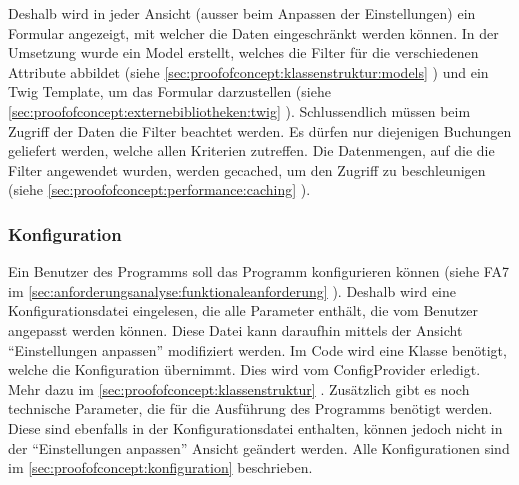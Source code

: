 Deshalb wird in jeder Ansicht (ausser beim Anpassen der Einstellungen) ein Formular angezeigt, mit welcher die Daten eingeschränkt werden können. In der Umsetzung wurde ein Model erstellt, welches die Filter für die verschiedenen Attribute abbildet (siehe \cref{sec:proofofconcept:klassenstruktur:models} ) und ein Twig Template, um das Formular darzustellen (siehe \cref{sec:proofofconcept:externebibliotheken:twig} ). Schlussendlich müssen beim Zugriff der Daten die Filter beachtet werden. Es dürfen nur diejenigen Buchungen geliefert werden, welche allen Kriterien zutreffen. Die Datenmengen, auf die die Filter angewendet wurden, werden gecached, um den Zugriff zu beschleunigen (siehe \cref{sec:proofofconcept:performance:caching} ).

\subsubsection{Konfiguration}
Ein Benutzer des Programms soll das Programm konfigurieren können (siehe FA7 im \cref{sec:anforderungsanalyse:funktionaleanforderung} ). Deshalb wird eine Konfigurationsdatei eingelesen, die alle Parameter enthält, die vom Benutzer angepasst werden können. Diese Datei kann daraufhin mittels der Ansicht "`Einstellungen anpassen"' modifiziert werden. Im Code wird eine Klasse benötigt, welche die Konfiguration übernimmt. Dies wird vom ConfigProvider erledigt. Mehr dazu im \cref{sec:proofofconcept:klassenstruktur} . Zusätzlich gibt es noch technische Parameter, die für die Ausführung des Programms benötigt werden. Diese sind ebenfalls in der Konfigurationsdatei enthalten, können jedoch nicht in der "`Einstellungen anpassen"' Ansicht geändert werden. Alle Konfigurationen sind im \cref{sec:proofofconcept:konfiguration}  beschrieben.



